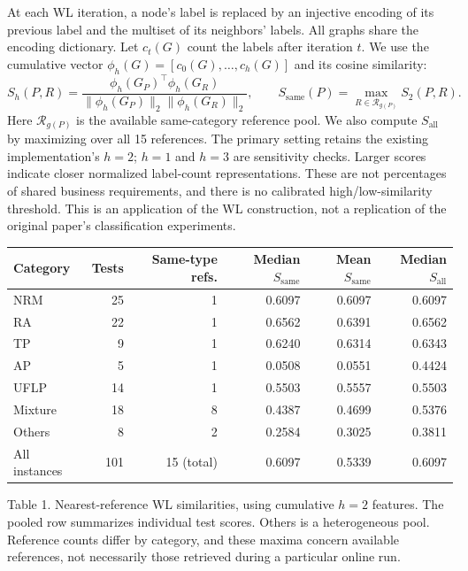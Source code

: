 \documentclass[10pt]{article}
\begin{document}
At each WL iteration, a node's label is replaced by an injective encoding of its
previous label and the multiset of its neighbors' labels. All graphs share the
encoding dictionary. Let $c_t(G)$ count the labels after iteration $t$. We use
the cumulative vector $\phi_h(G)=[c_0(G),\ldots,c_h(G)]$ and its cosine similarity:
\[
 S_h(P,R)=\frac{\phi_h(G_P)^\top\phi_h(G_R)}
 {\|\phi_h(G_P)\|_2\|\phi_h(G_R)\|_2},\qquad
 S_{\mathrm{same}}(P)=\max_{R\in\mathcal R_{g(P)}}S_2(P,R).
\]
Here $\mathcal R_{g(P)}$ is the available same-category reference pool. We also
compute $S_{\mathrm{all}}$ by maximizing over all 15 references. The primary
setting retains the existing implementation's $h=2$; $h=1$ and $h=3$ are
sensitivity checks. Larger scores indicate closer normalized label-count
representations. These are not percentages of shared business requirements,
and there is no calibrated high/low-similarity threshold. This is an application
of the WL construction, not a replication of the original paper's classification
experiments.

\begin{center}
\small
\begin{tabular}{@{}lrrrrr@{}}
\toprule
Category & Tests & Same-type refs. & Median $S_{\mathrm{same}}$ & Mean $S_{\mathrm{same}}$ & Median $S_{\mathrm{all}}$\\
\midrule
NRM     &25 &1 &0.6097&0.6097&0.6097\\
RA      &22 &1 &0.6562&0.6391&0.6562\\
TP      &9  &1 &0.6240&0.6314&0.6343\\
AP      &5  &1 &0.0508&0.0551&0.4424\\
UFLP    &14 &1 &0.5503&0.5557&0.5503\\
Mixture &18 &8 &0.4387&0.4699&0.5376\\
Others  &8  &2 &0.2584&0.3025&0.3811\\
\midrule
All instances &101&15 (total)&0.6097&0.5339&0.6097\\
\bottomrule
\end{tabular}
\par\vspace{3pt}
\parbox{\linewidth}{\footnotesize
Table 1. Nearest-reference WL similarities, using cumulative $h=2$ features.
The pooled row summarizes individual test scores. Others is a heterogeneous
pool. Reference counts differ by category, and these maxima concern available
references, not necessarily those retrieved during a particular online run.}
\end{center}
\end{document}
